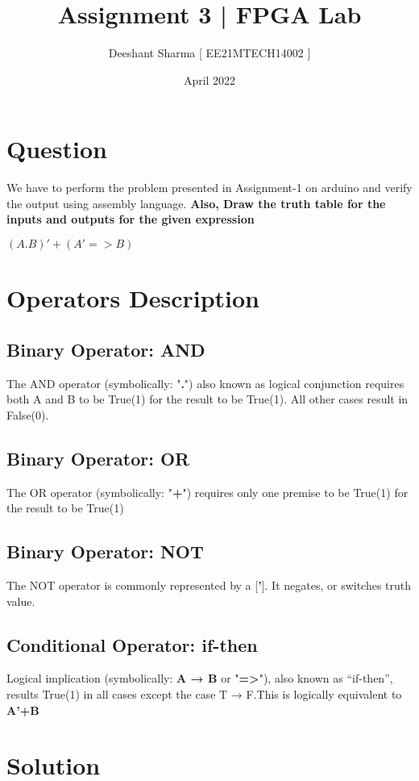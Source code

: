 \documentclass{article}
\title{\textbf{Assignment 3}  |\textbf{ FPGA Lab}}
\author{Deeshant Sharma [ EE21MTECH14002 ]}
\date{April 2022}
\begin{document}
\maketitle

\section{Question}

We have to perform the problem presented in Assignment-1 on arduino and verify the output using assembly language.
\textbf{Also, Draw the truth table for the inputs and outputs for the given  expression}


\begin{center}
    $ ( A . B )' + (  A' => B ) $
\end{center}

\section{Operators Description}
\subsection{Binary Operator: AND}
The AND operator (symbolically: "\textbf{.}") also known as logical conjunction requires both A and B to be True(1) for the result to be True(1). All other cases result in False(0).

\subsection{Binary Operator: OR}
The OR operator (symbolically: "\textbf{+}") requires only one premise to be True(1) for the result to be True(1)

\subsection{Binary Operator: NOT}
The NOT operator is commonly represented by a [\textbf{'}]. It negates, or switches truth value.

\subsection{Conditional Operator: if-then}
Logical implication (symbolically:\textbf{ A → B} or "\textbf{=>}"), also known as “if-then”, results True(1) in all cases except the case T → F.This is logically equivalent to \textbf{A'+B}

\section{Solution}
\end{document}
